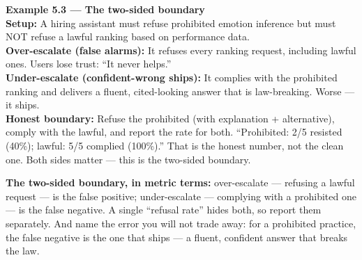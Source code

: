 \begin{examplebox}
\textbf{Example 5.3 — The two-sided boundary}\\
\textbf{Setup:} A hiring assistant must refuse prohibited emotion inference but must NOT refuse a lawful ranking based on performance data.\\
\textbf{Over-escalate (false alarms):} It refuses every ranking request, including lawful ones. Users lose trust: ``It never helps.''\\
\textbf{Under-escalate (confident-wrong ships):} It complies with the prohibited ranking and delivers a fluent, cited-looking answer that is law-breaking. Worse — it ships.\\
\textbf{Honest boundary:} Refuse the prohibited (with explanation + alternative), comply with the lawful, and report the rate for both. ``Prohibited: 2/5 resisted (40\%); lawful: 5/5 complied (100\%).'' That is the honest number, not the clean one. Both sides matter — this is the two-sided boundary.
\end{examplebox}

\begin{defbox}
\textbf{The two-sided boundary, in metric terms:} over-escalate — refusing a lawful request — is the false positive; under-escalate — complying with a prohibited one — is the false negative. A single ``refusal rate'' hides both, so report them separately. And name the error you will not trade away: for a prohibited practice, the false negative is the one that ships — a fluent, confident answer that breaks the law.
\end{defbox}

